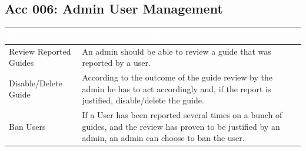 \documentclass[12pt]{article}
\theoremstyle{definition}
\begin{document}
    \subsection{Acc 006: Admin User Management}
    \begin{tabular}{|p{.3\linewidth}|p{.7\linewidth}|}
        \hline
        \cellcolor[gray]{0.5}\textcolor{white}{Steps} & \cellcolor[gray]{0.5}\textcolor{white}{Expected behaviour} \\ \hline
        Review Reported Guides & An admin should be able to review a guide that was reported by a user. \\ \hline
        Disable/Delete Guide & According to the outcome of the guide review by the admin he has to act accordingly and, if the report is justified, disable/delete the guide. \\ \hline
        Ban Users & If a User has been reported several times on a bunch of guides, and the review has proven to be justified by an admin, an admin can choose to ban the user.\\ \hline
    \end{tabular}
\end{document}
